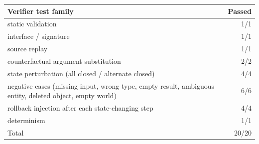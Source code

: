 \begin{tabular}{lr}
\toprule
Verifier test family & Passed\\
\midrule
static validation & 1/1\\
interface / signature & 1/1\\
source replay & 1/1\\
counterfactual argument substitution & 2/2\\
state perturbation (all closed / alternate closed) & 4/4\\
negative cases (missing input, wrong type, empty result, ambiguous entity, deleted object, empty world) & 6/6\\
rollback injection after each state-changing step & 4/4\\
determinism & 1/1\\
\midrule
Total & 20/20\\
\bottomrule
\end{tabular}
